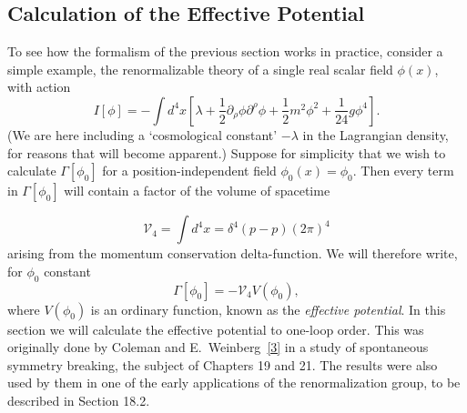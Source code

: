 \subsection{Calculation of the Effective Potential}
\label{sec:16.2}

To see how the formalism of the previous section works in practice,
consider a simple example, the renormalizable theory of a single real
scalar field $\phi(x)$, with action
\begin{equation}
 I[\phi] = -\int d^4x\left[\lambda+\frac{1}{2}\partial_\rho\phi\partial^\rho\phi
 +\frac{1}{2}m^2\phi^2+\frac{1}{24}g\phi^4\right] .
 \tag{16.2.1}
 \label{eq:16.2.1}
\end{equation}
(We are here including a `cosmological constant' $-\lambda$ in the Lagrangian
density, for reasons that will become apparent.) Suppose for simplicity
that we wish to calculate $\Gamma[\phi_0]$ for a position-independent field $\phi_0(x) =
\phi_0$. Then every term in $\Gamma[\phi_0]$ will contain a factor of the volume of
spacetime



\begin{equation}
 \mathcal{V}_4 = \int d^4x = \delta^4(p-p)(2\pi)^4
 \tag{16.2.2}
 \label{eq:16.2.2}
\end{equation}
arising from the momentum conservation delta-function. We will therefore
write, for $\phi_0$ constant
\begin{equation}
 \Gamma[\phi_0] = -\mathcal{V}_4 V(\phi_0) ,
 \tag{16.2.3}
 \label{eq:16.2.3}
\end{equation}
where $V(\phi_0)$ is an ordinary function, known as the \emph{effective potential}. In
this section we will calculate the effective potential to one-loop order.
This was originally done by Coleman and E.~Weinberg~\hyperref[ch16-ref-3]{[3]} in a study of
spontaneous symmetry breaking, the subject of Chapters 19 and 21. The
results were also used by them in one of the early applications of the
renormalization group, to be described in Section 18.2.

